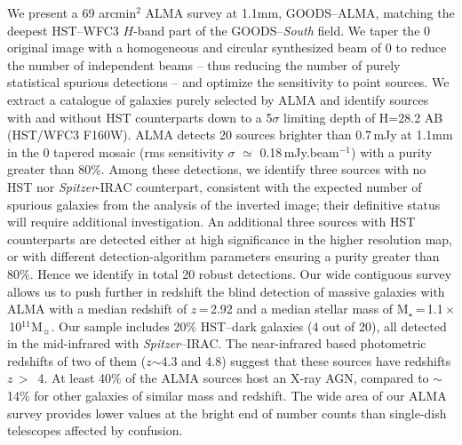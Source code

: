 \documentclass[longauth]{aa}
\begin{document}
\abstract{}
{We present a 69 arcmin$^2$ ALMA survey at 1.1mm, GOODS--ALMA, matching the deepest HST--WFC3 $H$-band part of the GOODS--\textit{South} field.}
{We taper the 0 original image with a homogeneous and circular synthesized beam of 0 to reduce the number of independent beams -- thus reducing the number of purely statistical spurious detections -- and optimize the sensitivity to point sources. We extract a catalogue of galaxies purely selected by ALMA and identify sources with and without HST counterparts down to a 5$\sigma$ limiting depth of H=28.2 AB (HST/WFC3 F160W).}
{ALMA detects 20 sources brighter than 0.7\,mJy at 1.1mm in the 0 tapered mosaic (rms sensitivity $\sigma$ $\simeq$ 0.18\,mJy.beam$^{-1}$) with a purity greater than 80\%. Among these detections, we identify three sources with no HST nor \textit{Spitzer}-IRAC counterpart, consistent with the expected number of spurious galaxies from the analysis of the inverted image; their definitive status will require additional investigation. An additional three sources with HST counterparts are detected either at high significance in the higher resolution map, or with different detection-algorithm parameters ensuring a purity greater than 80\%. Hence we identify in total 20 robust detections.}
{Our wide contiguous survey allows us to push further in redshift the blind detection of massive galaxies with ALMA with a median redshift of $z$\,=\,2.92 and a median stellar mass of $\text{M}_{\star}$\,=\,1.1\,$\times$\,10$^{11}$M$_\sun$. Our sample includes 20\% HST--dark galaxies (4 out of 20), all detected in the mid-infrared with \textit{Spitzer}--IRAC. The near-infrared based photometric redshifts of two of them ($z$$\sim$4.3 and 4.8) suggest that these sources have redshifts $z$\,$>$\, 4. At least 40\% of the ALMA sources host an X-ray AGN, compared to $\sim$14\% for other galaxies of similar mass and redshift. The wide area of our ALMA survey provides lower values at the bright end of number counts than single-dish telescopes affected by confusion.}



    \maketitle
\end{document}
